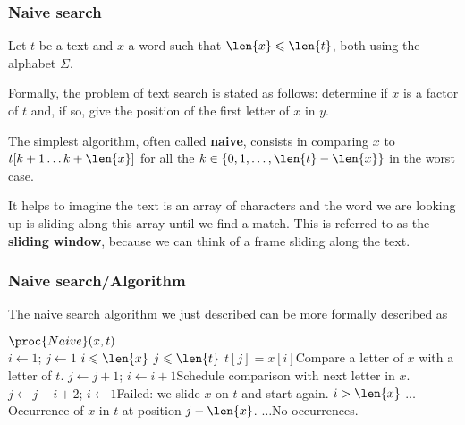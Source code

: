 
%
\begin{frame}
\frametitle{Naive search}

Let \(t\) be a text and \(x\) a word such that \(\len{x} \leqslant
\len{t}\), both using the alphabet \(\Sigma\).

\bigskip

Formally, the problem of text search is stated as follows: determine
if \(x\) is a factor of \(t\) and, if so, give the position of the
first letter of \(x\) in \(y\).

\bigskip

The simplest algorithm, often called \textbf{naive}, consists in
comparing \(x\) to \(t[k+1 \dots k+\len{x}]\) for all the \(k \in \{0,
1, \dots, \len{t} - \len{x}\}\) in the worst case.

\bigskip

It helps to imagine the text is an array of characters and the word we
are looking up is sliding along this array until we find a match. This
is referred to as the \textbf{sliding window}, because we can think of
a frame sliding along the text.

\end{frame}

%
\begin{frame}
\frametitle{Naive search/Algorithm}

The naive search algorithm we just described can be more formally
described as
{\footnotesize
\begin{codebox}
\(\proc{Naive} (x, t)\)\\
\li \(i \gets 1\); \(j \gets 1\)
\li \While \(i \leqslant \len{x}\) \LogAnd \(j \leqslant \len{t}\)
\li \Do \If \(t[j] = x[i]\)\>\>\>\>\>\>\>\>\Comment Compare a letter of \(x\) with a letter
of \(t\).
\li	  \Then \(j \gets j + 1\); \(i \gets i + 1\)\>\>\>\>\>\>\Comment Schedule comparison with next letter in \(x\).
\li	  \Else \(j \gets j - i + 2\); \(i \gets 1\)\>\>\>\>\>\>\Comment Failed: we slide \(x\) on \(t\) and start again.\End \End
\li \If \(i > \len{x}\) 
\li \Then \(\ldots\)\>\>\>\>\>\>\>\>\Comment Occurrence of \(x\) in \(t\) at position \(j - \len{x}\).
\li \Else \(\ldots\)\>\>\>\>\>\>\>\>\Comment No occurrences. \End
\end{codebox}
}

\end{frame}

